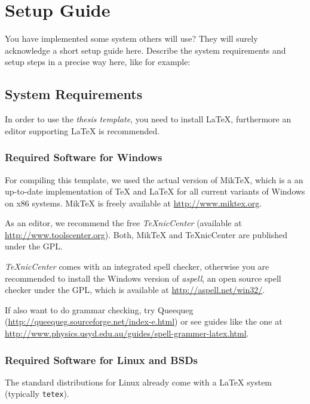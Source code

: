 
\chapter{Setup Guide}

You have implemented some system others will use? They will surely
acknowledge a short setup guide here. Describe the system
requirements and setup steps in a precise way here, like for
example:

\section{System Requirements}

In order to use the \emph{thesis template}, you need to install
\LaTeX, furthermore an editor supporting {\LaTeX} is recommended.

\subsection{Required Software for Windows}

For compiling this template, we used the actual version of MikTeX,
which is a an up-to-date implementation of {\TeX} and {\LaTeX} for
all current variants of Windows on x86 systems. MikTeX is freely
available at \url{http://www.miktex.org}.

As an editor, we recommend the free \emph{TeXnicCenter} (available
at \url{http://www.toolscenter.org}). Both, MikTeX and TeXnicCenter
are published under the \ac{GPL}.

\emph{TeXnicCenter} comes with an integrated spell checker,
otherwise you are recommended to install the Windows version of
\emph{aspell}, an open source spell checker under the \ac{GPL},
which is available at \url{http://aspell.net/win32/}.

If also want to do
 grammar checking, try Queequeg
(\url{http://queequeg.sourceforge.net/index-e.html}) or see guides
like the one at
\url{http://www.physics.usyd.edu.au/guides/spell-grammer-latex.html}.

\subsection{Required Software for Linux and BSDs}

The standard distributions for Linux already come with a {\LaTeX}
system (typically \texttt{tetex}).

